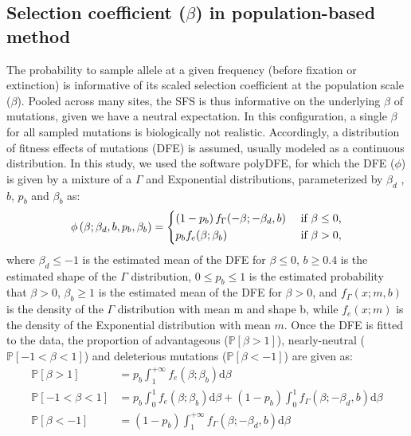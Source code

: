 \documentclass{article}
\newcommand{\der}{\mathrm{d}}
\newcommand{\proba}{\mathbb{P}}
\newcommand{\Spop}{\beta}
\newcommand{\polyDel}{\Spop < -1}
\newcommand{\polyNeutral}{-1 < \Spop < 1}
\newcommand{\polyAdv}{ \Spop > 1}
\newcommand{\PpolyDel}{\proba \left[ \polyDel \right]}
\newcommand{\PpolyNeutral}{\proba \left[ \polyNeutral \right]}
\newcommand{\PpolyAdv}{\proba \left[ \polyAdv \right]}
\begin{document}
    \subsection{Selection coefficient ($\Spop$) in population-based method}
    \label{subsec:s-polymorphism-method}
    The probability to sample allele at a given frequency (before fixation or extinction) is informative of its scaled selection coefficient at the population scale ($\Spop$).
    Pooled across many sites, the SFS is thus informative on the underlying $\Spop$ of mutations, given we have a neutral expectation.
    In this configuration, a single $\Spop$ for all sampled mutations is biologically not realistic.
    Accordingly, a distribution of fitness effects of mutations (DFE) is assumed, usually modeled as a continuous distribution\cite{eyre-walker_distribution_2006, eyre-walker_estimating_2009}.
    In this study, we used the software polyDFE\cite{tataru_inference_2017, tataru_polydfe_2020}, for which the DFE ($\phi$) is given by a mixture of a $\Gamma$ and Exponential distributions, parameterized by $\Spop_d$ , $b$, $p_b$
    and $\Spop_b$ as:
    \begin{equation*}
        \phi \left( \Spop; \Spop_d , b, p_b, \Spop_b \right) =
        \begin{dcases}
            \left( 1 - p_b \right) f_{\Gamma}(-\Spop; -\Spop_d, b) & \text{ if $\Spop \leq 0$,} \\
            p_b f_{e}(\Spop; \Spop_b) & \text{ if $\Spop > 0$,} \\
        \end{dcases}
    \end{equation*}
    where $\Spop_d \leq -1 $ is the estimated mean of the DFE for $\Spop \leq 0$,
    $b \geq 0.4$ is the estimated shape of the $\Gamma$ distribution,
    $0 \leq p_b \leq 1$ is the estimated probability that $\Spop > 0$,
    $\Spop_b \geq 1$ is the estimated mean of the DFE for $\Spop > 0$,
    and $f_{\Gamma}(x; m, b)$ is the density of the $\Gamma$ distribution with mean m and shape b, while $f_{e}(x; m)$ is the density of the Exponential distribution with mean $m$.
    Once the DFE is fitted to the data, the proportion of advantageous ($\PpolyAdv$), nearly-neutral ($\PpolyNeutral$) and deleterious mutations ($\PpolyDel$) are given as:
    \begin{align*}
        \PpolyAdv &= p_b \int_{1}^{+\infty} f_{e}(\Spop; \Spop_b) \der \Spop  \\
        \PpolyNeutral &= p_b \int_{0}^{1} f_{e}(\Spop; \Spop_b) \der \Spop + \left( 1 - p_b \right) \int_{0}^{1} f_{\Gamma}(\Spop; -\Spop_d, b) \der \Spop \\
        \PpolyDel &= \left( 1 - p_b \right) \int_{1}^{+\infty} f_{\Gamma}(\Spop; -\Spop_d, b) \der \Spop
    \end{align*}
\end{document}
